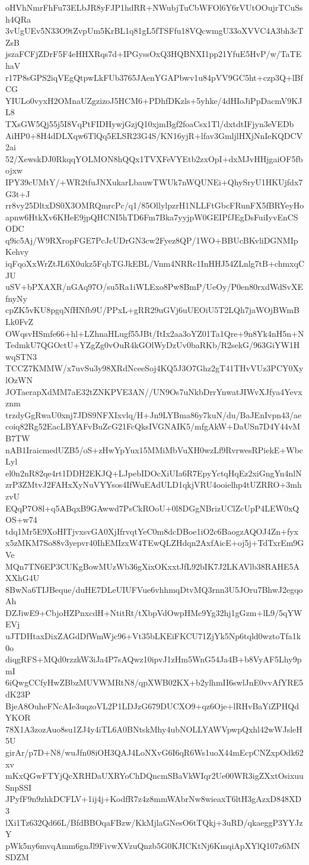 oHVhNmrFhFu73ELbJR8yFJP1hdRR+NWubjTuCbWFOl6Y6rVUtOOujrTCuSsh4QRa
3vUgUEv5N33O9tZvpUm5KrBL1q81gL5fTSFfu18VQcwmgU33oXVVC4A3bh3cTZsB
jszaFCFjZDrF5F4eHHXRqs7d+IPGyssOxQ3HQBNXI1pp21YfuE5HvP/w/TaTEhaV
r17P8sGPS2iqVEgQtpwLkFUb3765JAenYGAPbwv1u84pVV9GC5ht+czp3Q+lBfCG
YIULo0vyxH2OMnaUZgzizoJ5HCM6+PDhfDKzls+5yhke/4dHIoJiPpDacmV9KJL8
TXsGW5Qj55j5I8VqPtFIDHywjGzjQ10xjmBgf2foaCsx1Tl/dxtdtIFjyn3eVEDb
AiHP0+8H4dDLXqw6TlQq5ELSR23G4S/KN16yjR+lfav3GmljlHXjNnIeKQDCV2ai
52/XewskDJ0RkqqYOLMON8hQQx1TVXFeVYEtb2zxOpI+dxMJvHHjgaiOF5fbojxw
IPY39cUMtY/+WR2tfuJNXukarLbauwTWUk7nWQUNEi+QhySryU1HKUjfdx7G3t+J
rr8vy25DltxDS0X3OMRQmrcPc/q1/85OllylpzrH1NLLFtGbcFRunFX5fBRYeyHo
apnw6HtkXv6KHeE9jpQHCNI5hTD6Fm7Bka7yyjpW0GEIPfJEgDsFuiIyvEnCSODC
q9ic5Aj/W9RXropFGE7PcJcUDrGN3cw2Fyez8QP/1WO+BBUcBKvliDGNMIpKehvy
iqFqoXxWrZtJL6X0ukz5FqbTGJkEBL/Vnm4NRRc1InHHJ54ZLnlg7tB+chmxqCJU
uSV+bPXAXR/nGAq97O/su5Ra1iWLExo8Pw8BmP/UeOy/P0en80rxdWdSvXEfnyNy
cpZK5vKU8pgqNfHNfb9U/PPxL+gRR29uGVj6uUEOiU5T2LQh7jaWOjBWmBLk0FvZ
OWqsvHSmfe66+hl+LZhnaHLugf55JBt/ItIx2aa3oYZ01Ta1Qre+9n8Yk4nH5n+N
TedmkU7QGOctU+YZgZg0vOuR4kGOlWyDzUv0baRKb/R2sekG/963GiYW1HwqSTN3
TCCZ7KMMW/x7uvSu3y98XRdNceeSoj4KQ5J3O7Ghz2gT41THvVUz3PCY0XylOzWN
JOTaerapXdMM7aE32tZNKPVE3AN//UN9Os7uNkbDrrYnwatJIWvXJfya4Yevxznm
trzdyGgRwaU0xnj7JDS9NFXIxvlq/H+Jn9LYBma86y7kuN/du/BaJEnIvpn43/ae
coiq82Rg52EacLBYAFvBuZcG21FcQksIVGNAIK5/mfgAkW+DaUSn7D4Y44vMB7TW
nAB1IraicmedUZB5/oS+zHwYpYux15MMiMbVuXH0wzLf9RvrwesRPiekE+WbcLyl
el0n2nR82qe4rt1DDH2EKJQ+LJpebIDOcXiUIa6R7EpyYctqHqEz2xiGngYn4nlN
zrP3ZMtvJ2FAHxXyNuVYYsos4IfWuEAdULD1qkjVRU4ooielhp4tUZRRO+3mhzvU
EQqP7O8l+q5ABqxB9GAwwd7PsCkROoU+0l8DGgNBrizUClZcUpP4LEW0xQOS+w74
tdq1Mr5E9XoHITjvxsvGA0XjIfrvqtYeC0m8dcDBoe1iO2c6BaogzAQOJ4Zn+fyx
x5zMKM7So88v3yepvr40IhEMIzxW4TEwQLZHdqn2AxfAicE+oj5j+TdTxrEm9GVe
MQn7TN6EP3CUKgBowMUzWb36gXixOKxxtJfL92bIK7J2LKAVlb38RAHE5AXXhG4U
8BwNa6TIJBeque/duHE7DLeUIUFVue6vhhmqDtvMQ3rnn3U5JOru7BhwJ2egqoAh
DZJiwE9+CbjoHZPnxcdH+NtitRt/tXbpVdOwpHMc9Yg32hj1gGzm+lL9/5qYWEVj
uJTDHtaxDixZAGdDfWmWjc96+Vt35bLKEiFKCU71ZjYk5Np6tqld0wztoTfa1k0o
diqgRFS+MQd0rzzkW3iJa4P7sAQwz10ipvJ1zHm5WnG54Ja4B+b8VyAF5Lhy9pmI
6iQwgCCfyHwZBbzMUVWMRtN8/qpXWB02KX+b2ylhmII6swlJnE0vvAfYRE5dK23P
BjeA8OuheFNcAIe3uqzoVL2P1LDJzG679DUCXO9+qz6Oje+lRHvBaYiZPHQdYKOR
78X1A3zozAuo8su1ZJ4y4iTL6A0BNtskMhy4ubNOLLYAWVpwpQxhl42wWJsleH5U
girAr/p7D+N8/wuJfn08iOH3QAJ4LoNXvG6I6qR6Ws1uoX44mEcpCNZxpOdk62xv
mKxQGwFTYjQcXRHDaUXRYoChDQncmSBaVkWIqr2Ue00WR3igZXxtOsixuuSnpSSI
JPyfF9n9zhkDCFLV+1ij4j+KodfR7z4z8mmWAbrNw8wieaxT6ltH3gAzxD848XD3
lXi1Tz632Qd66L/BfdBBOqaFBzw/KkMjlaGNesO6tTQkj+3uRD/qkaeggP3YYJzY
pWk5ny6mvqAmm6gnJl9FivwXVzuQnzb5G0KJICKtNj6KmqiApXYlQ107z6MNSDZM
